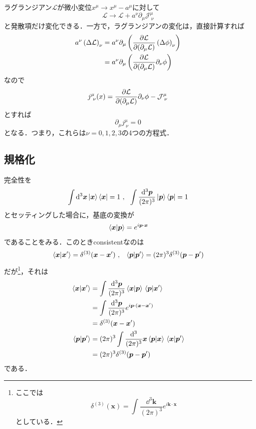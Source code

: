 \documentclass[a4paper,pdflatex,ja=standard]{bxjsarticle}
\begin{document}
ラグランジアン$\mathcal{L}$が微小変位$x^{\mu}\rightarrow x^{\mu}-a^{\mu}$に対して
\begin{equation}
  \mathcal{L}
  \rightarrow
  \mathcal{L}
  +
  a^{\nu}\partial_{\mu}\mathcal{J}^{\mu}_{\ \nu}
\end{equation}
と発散項だけ変化できる．一方で，ラグランジアンの変化は，直接計算すれば
\begin{align}
  a^{\nu}
  \left(  
    \Delta \mathcal{L}
  \right)_{\nu}
  &=
  a^{\nu}\partial_{\mu}
  \left(  
    \pdv{\mathcal{L}}{(\partial_{\mu}\mathcal{L})}\left( \Delta\phi \right)_{\nu}
  \right)
  \nonumber
  \\
  &=
  a^{\nu}\partial_{\mu}
  \left(  
    \pdv{\mathcal{L}}{(\partial_{\mu}\mathcal{L})}\partial_{\nu}\phi
  \right)
\end{align}
なので
\begin{equation}
  j^{\mu}_{\ \nu}(x)
  =
  \pdv{\mathcal{L}}{(\partial_{\mu}\mathcal{L})}\partial_{\nu}\phi
  -
  \mathcal{J}^{\mu}_{\ \nu}
\end{equation}
とすれば
\begin{equation}
  \partial_{\mu}j^{\mu}_{\ \nu}=0
\end{equation}
となる．つまり，これらは$\nu=0,1,2,3$の4つの方程式．

\subsection{規格化}

完全性を
\begin{equation}
  \int\dd^3 \bm{x} \ket{\bm{x}}\bra{\bm{x}}
  =
  1
  \ ,\ \ 
  \int\frac{\dd^3 \bm{p}}{(2\pi)^3} \ket{\bm{p}}\bra{\bm{p}}
  =
  1
\end{equation}
とセッティングした場合に，基底の変換が
\begin{equation}
  \ev*{\bm{x}|\bm{p}}
  =
  e^{i\bm{p}\cdot\bm{x}}
\end{equation}
であることをみる．このときconsistentなのは
\begin{equation}
  \ev*{\bm{x}|\bm{x}'}=\delta^{(3)}(\bm{x}-\bm{x}')
  \ ,\ \ 
  \ev*{\bm{p}|\bm{p}'}=(2\pi)^{3}\delta^{(3)}(\bm{p}-\bm{p}')
\end{equation}
だが\footnote{
  ここでは
  \begin{equation}
    \delta^{(3)}(\bm{x})
    =
    \int\frac{\dd^3 \bm{k}}{(2\pi)^3}
    e^{i\bm{k}\cdot\bm{x}}
    \nonumber
  \end{equation}
  としている．
}，それは
\begin{align}
  \ev*{\bm{x}|\bm{x}'}
  &=
  \int\frac{\dd^3 \bm{p}}{(2\pi)^3}\ev*{\bm{x}|\bm{p}}\ev*{\bm{p}|\bm{x}'}
  \nonumber
  \\
  &=
  \int\frac{\dd^3 \bm{p}}{(2\pi)^3}e^{i\bm{p}\cdot(\bm{x}-\bm{x}')}
  \nonumber
  \\
  &=
  \delta^{(3)}(\bm{x}-\bm{x}')
  \\
  \ev*{\bm{p}|\bm{p}'}
  &=
  (2\pi)^3\int\frac{\dd^3}{(2\pi)^3} \bm{x}\ev*{\bm{p}|\bm{x}}\ev*{\bm{x}|\bm{p}'}
  \nonumber
  \\
  &=
  (2\pi)^{3}\delta^{(3)}(\bm{p}-\bm{p}')
  \label{comp}
\end{align}
である．
\\
\end{document}
